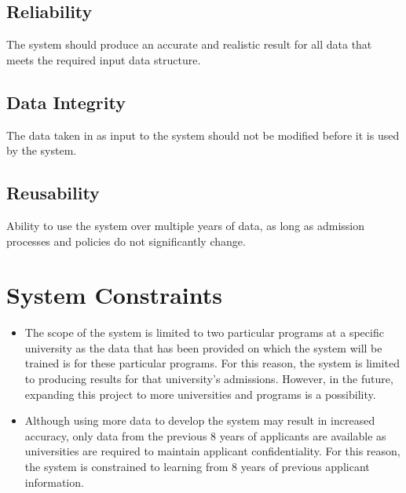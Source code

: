 \documentclass{article}
\begin{document}
\begin{normalsize}
    \subsection{Reliability}
        The system should produce an accurate and realistic result for all data that meets the required input data structure.

    \subsection{Data Integrity}
        The data taken in as input to the system should not be modified before it is used by the system.

    \subsection{Reusability}
        Ability to use the system over multiple years of data, as long as admission processes and policies do not significantly change.
  
    \section{System Constraints}
        \begin{itemize}
            \item The scope of the system is limited to two particular programs at a specific university as the data that has been provided on which the system will be trained is for these particular programs. For this reason, the system is limited to producing results for that university's admissions. However, in the future, expanding this project to more universities and programs is a possibility.
            \item Although using more data to develop the system may result in increased accuracy, only data from the previous 8 years of applicants are available as universities are required to maintain applicant confidentiality. For this reason, the system is constrained to learning from 8 years of previous applicant information.
        \end{itemize}

\end{normalsize}
\end{document}
